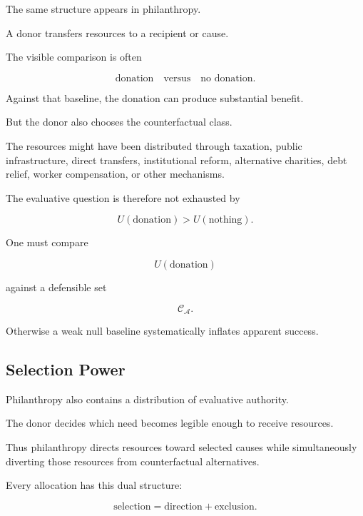 \documentclass[11pt]{article}
\theoremstyle{remark}
\newcommand{\Adm}{\mathcal{A}}
\begin{document}
The same structure appears in philanthropy.

A donor transfers resources to a recipient or cause.

The visible comparison is often

\begin{equation}
\text{donation}
\quad\text{versus}\quad
\text{no donation}.
\end{equation}

Against that baseline, the donation can produce substantial benefit.

But the donor also chooses the counterfactual class.

The resources might have been distributed through taxation, public infrastructure, direct transfers, institutional reform, alternative charities, debt relief, worker compensation, or other mechanisms.

The evaluative question is therefore not exhausted by

\begin{equation}
U(\text{donation})
>
U(\text{nothing}).
\end{equation}

One must compare

\begin{equation}
U(\text{donation})
\end{equation}

against a defensible set

\begin{equation}
\mathcal{C}_{\Adm}.
\end{equation}

Otherwise a weak null baseline systematically inflates apparent success.

\subsection{Selection Power}

Philanthropy also contains a distribution of evaluative authority.

The donor decides which need becomes legible enough to receive resources.

Thus philanthropy directs resources toward selected causes while simultaneously diverting those resources from counterfactual alternatives.

Every allocation has this dual structure:

\begin{equation}
\text{selection}
=
\text{direction}
+
\text{exclusion}.
\end{equation}
\end{document}
